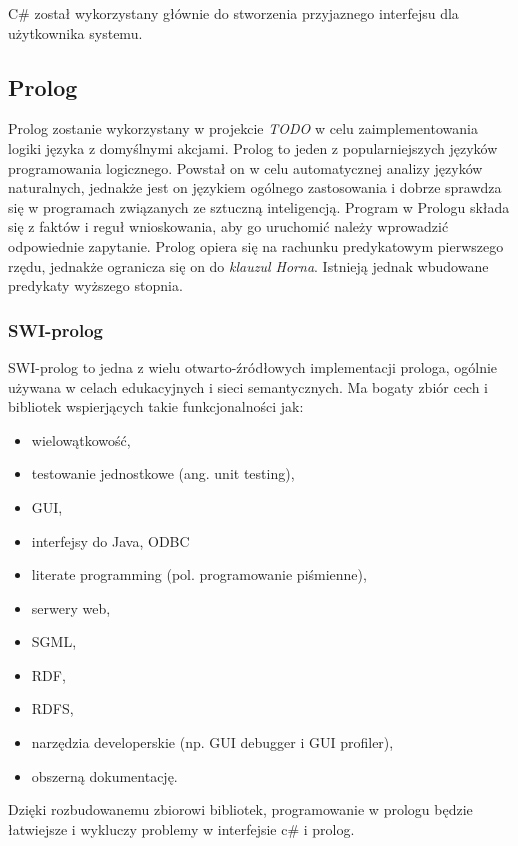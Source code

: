 \documentclass[a4paper]{article}
\begin{document}
    C\# został wykorzystany głównie do stworzenia przyjaznego interfejsu
    dla użytkownika systemu.

    \subsection{Prolog}
    Prolog zostanie wykorzystany w projekcie \textit{TODO} w celu
    zaimplementowania logiki języka z domyślnymi akcjami. Prolog to
    jeden z popularniejszych języków programowania logicznego. Powstał on
    w celu automatycznej analizy języków naturalnych, jednakże jest on
    językiem ogólnego zastosowania i dobrze sprawdza się w programach 
    związanych ze sztuczną inteligencją. Program w Prologu składa się z faktów
    i reguł wnioskowania, aby go uruchomić należy wprowadzić odpowiednie 
    zapytanie. Prolog opiera się na rachunku predykatowym pierwszego rzędu,
    jednakże ogranicza się on do \textit{klauzul Horna}. Istnieją jednak
    wbudowane predykaty wyższego stopnia.

    \subsubsection{SWI-prolog}
        SWI-prolog to jedna z wielu otwarto-źródłowych implementacji prologa,
        ogólnie używana w celach edukacyjnych i sieci semantycznych. Ma bogaty
        zbiór cech i bibliotek wspierjących takie funkcjonalności jak:
        \begin{itemize}
            \item wielowątkowość,
            \item testowanie jednostkowe (ang. unit testing),
            \item GUI,
            \item interfejsy do Java, ODBC
            \item literate programming (pol. programowanie piśmienne),
            \item serwery web,
            \item SGML,
            \item RDF,
            \item RDFS,
            \item narzędzia developerskie (np. GUI debugger i GUI profiler),
            \item obszerną dokumentację.

        \end{itemize}

        Dzięki rozbudowanemu zbiorowi bibliotek, programowanie w prologu
        będzie łatwiejsze i wykluczy problemy w interfejsie c\# i prolog.
\end{document}
